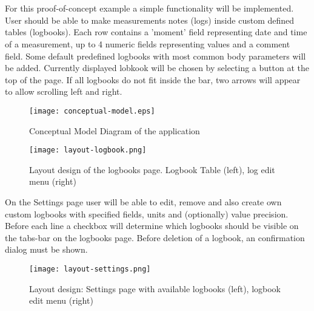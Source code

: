 \chapter{}%
\label{ch:poc}

\section{}%
\label{sec:design}

For this proof-of-concept example a simple functionality will be implemented. User should be able to make measurements notes (logs) inside custom defined tables (logbooks). Each row contains a 'moment' field representing date and time of a measurement, up to 4 numeric fields representing values and a comment field. Some default predefined logbooks with most common body parameters will be added. Currently displayed lobkook will be chosen by selecting a button at the top of the page. If all logbooks do not fit inside the bar, two arrows will appear to allow scrolling left and right.

\begin{figure}[H]
    \centering
    \texttt{[image: conceptual-model.eps]}
    \caption[Conceptual Model Diagram]{\label{fig:conceptmodel} Conceptual Model Diagram of the application}
\end{figure}

\begin{figure}[H]
    \centering
    \texttt{[image: layout-logbook.png]}
    \caption[Logbooks page layout design]{\label{fig:layoutlogbook} Layout design of the logbooks page. Logbook Table (left), log edit menu (right) }
\end{figure}

On the Settings page user will be able to edit, remove and also create own custom logbooks with specified fields, units and (optionally) value precision. Before each line a checkbox will determine which logbooks should be visible on the tabs-bar on the logbooks page. Before  deletion of a logbook, an confirmation dialog must be shown.

\begin{figure}[H]
    \centering
    \texttt{[image: layout-settings.png]}
    \caption[Settings page layout design]{\label{fig:layoutsettings} Layout design: Settings page with available logbooks (left), logbook edit menu (right)}
\end{figure}

